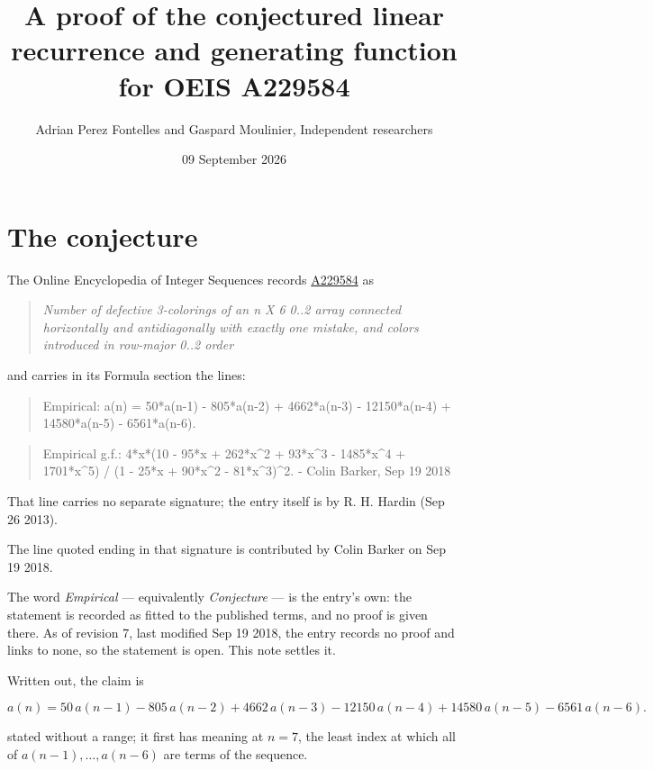 \documentclass[11pt]{article}
\title{A proof of the conjectured linear recurrence and generating function for OEIS A229584}
\author{Adrian Perez Fontelles and Gaspard Moulinier, Independent researchers}
\date{09 September 2026}
\theoremstyle{definition}
\begin{document}
\maketitle
\section{The conjecture}

The Online Encyclopedia of Integer Sequences records \href{https://oeis.org/A229584}{A229584} as

\begin{quote}\itshape Number of defective 3-colorings of an n X 6 0..2 array connected horizontally and antidiagonally with exactly one mistake, and colors introduced in row-major 0..2 order\end{quote}

and carries in its Formula section the lines:

\begin{quote}\ttfamily Empirical: a(n) = 50*a(n-1) - 805*a(n-2) + 4662*a(n-3) - 12150*a(n-4) + 14580*a(n-5) - 6561*a(n-6).\end{quote}

\begin{quote}\ttfamily Empirical g.f.: 4*x*(10 - 95*x + 262*x\textasciicircum{}2 + 93*x\textasciicircum{}3 - 1485*x\textasciicircum{}4 + 1701*x\textasciicircum{}5) / (1 - 25*x + 90*x\textasciicircum{}2 - 81*x\textasciicircum{}3)\textasciicircum{}2. - Colin Barker, Sep 19 2018\end{quote}

That line carries no separate signature; the entry itself is by R. H. Hardin (Sep 26 2013).

The line quoted ending in that signature is contributed by Colin Barker on Sep 19 2018.

The word {\itshape Empirical} --- equivalently {\itshape Conjecture} --- is the entry's own: the statement is recorded as fitted to the published terms, and no proof is given there. As of revision 7, last modified Sep 19 2018, the entry records no proof and links to none, so the statement is open. This note settles it.

Written out, the claim is

\[a(n) = 50\,a(n-1) - 805\,a(n-2) + 4662\,a(n-3) - 12150\,a(n-4) + 14580\,a(n-5) - 6561\,a(n-6).\]

stated without a range; it first has meaning at $n = 7$, the least index at which all of $a(n-1),\dots,a(n-6)$ are terms of the sequence.
\end{document}
